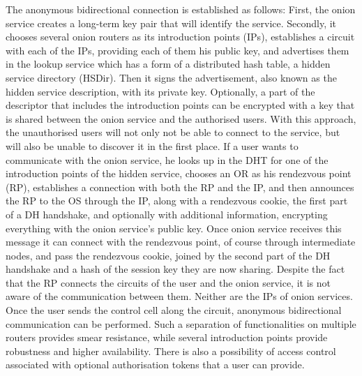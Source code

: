 The anonymous bidirectional connection is established as follows:
First, the onion service creates a long-term key pair that will identify the service. Secondly, it chooses several onion routers as its introduction points (IPs), establishes a circuit with each of the IPs, providing each of them his public key, and advertises them in the lookup service which has a form of a distributed hash table, a hidden service directory (HSDir). Then it signs the advertisement, also known as the hidden service description, with its private key. Optionally, a part of the descriptor that includes the introduction points can be encrypted with a key that is shared between the onion service and the authorised users. With this approach, the unauthorised users will not only not be able to connect to the service, but will also be unable to discover it in the first place.
If a user wants to communicate with the onion service, he looks up in the DHT for one of the introduction points of the hidden service, chooses an OR as his rendezvous point (RP), establishes a connection with both the RP and the IP, and then announces the RP to the OS through the IP, along with a rendezvous cookie, the first part of a DH handshake, and optionally with additional information, encrypting everything with the onion service’s public key. Once onion service receives this message it can connect with the rendezvous point, of course through intermediate nodes, and pass the rendezvous cookie, joined by the second part of the DH handshake and a hash of the session key they are now sharing. Despite the fact that the RP connects the circuits of the user and the onion service, it is not aware of the communication between them. Neither are the IPs of onion services. Once the user sends the control cell along the circuit, anonymous bidirectional communication can be performed.
Such a separation of functionalities on multiple routers provides smear resistance, while several introduction points provide robustness and higher availability.
There is also a possibility of access control associated with optional authorisation tokens that a user can provide.


